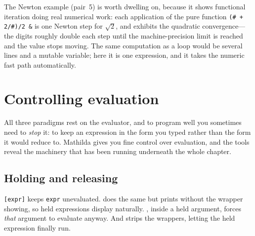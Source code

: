 The Newton example (pair~5) is worth dwelling on, because it shows functional
iteration doing real numerical work: each application of the pure function
\texttt{(\# + 2/\#)/2 \&} is one Newton step for \(\sqrt 2\), and 
exhibits the quadratic convergence---the digits roughly double each step until the
machine-precision limit is reached and the value stops moving. The same
computation as a  loop would be several lines and a mutable variable;
here it is one expression, and it takes the numeric fast path automatically.


\section{Controlling evaluation}
\label{sec:prog-evaluation}

All three paradigms rest on the evaluator, and to program well you sometimes need
to \emph{stop} it: to keep an expression in the form you typed rather than the
form it would reduce to. Mathilda gives you fine control over evaluation, and the
tools reveal the machinery that has been running underneath the whole chapter.

\subsection{Holding and releasing}
\label{ssec:prog-hold}

\texttt{[expr]} keeps \texttt{expr} unevaluated.  does the
same but prints without the wrapper showing, so held expressions display
naturally. , inside a held argument, forces \emph{that} argument to
evaluate anyway. And  strips the wrappers, letting the held
expression finally run.

